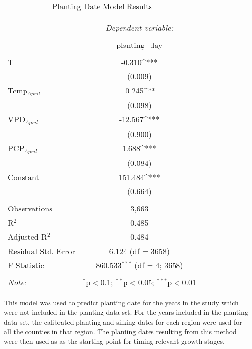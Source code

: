 \begin{table}[H] 
  \caption{Planting Date Model Results} 
  \label{} 
\begin{tabular}{@{\extracolsep{5pt}}lc} 
\\[-1.8ex]\hline 
\hline \\[-1.8ex] 
 & \multicolumn{1}{c}{\textit{Dependent variable:}} \\ 
\cline{2-2} 
\\[-1.8ex] & \multicolumn{1}{c}{planting\_day} \\ 
\hline \\[-1.8ex] 
 T & -0.310^{***} \\ 
  & (0.009) \\ 
 Temp$_{April}$ & -0.245^{**} \\ 
  & (0.098) \\ 
 VPD$_{April}$ & -12.567^{***} \\ 
  & (0.900) \\ 
 PCP$_{April}$ & 1.688^{***} \\ 
  & (0.084) \\ 
 Constant & 151.484^{***} \\ 
  & (0.664) \\ 
\hline \\[-1.8ex] 
Observations & \multicolumn{1}{c}{3,663} \\ 
R$^{2}$ & \multicolumn{1}{c}{0.485} \\ 
Adjusted R$^{2}$ & \multicolumn{1}{c}{0.484} \\ 
Residual Std. Error & \multicolumn{1}{c}{6.124 (df = 3658)} \\ 
F Statistic & \multicolumn{1}{c}{860.533$^{***}$ (df = 4; 3658)} \\ 
\hline 
\hline \\[-1.8ex] 
\textit{Note:}  & \multicolumn{1}{r}{$^{*}$p$<$0.1; $^{**}$p$<$0.05; $^{***}$p$<$0.01} \\ 
\end{tabular} 
\end{table} 

This model was used to predict planting date for the years in the study which were not included in the planting data set. For the years included in the planting data set, the calibrated planting and silking dates for each region were used for all the counties in that region. The planting dates resulting from this method were then used as  as the starting point for timing relevant growth stages.

